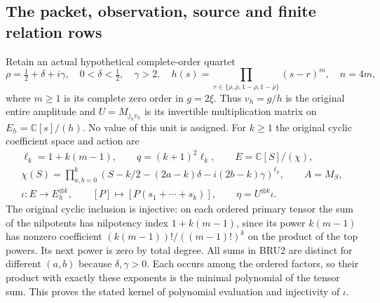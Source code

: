 \documentclass[11pt,a4paper]{article}
\begin{document}
\subsection{The packet, observation, source and finite relation rows}

Retain an actual hypothetical complete-order quartet
\[
 \rho=\tfrac12+\delta+i\gamma,\quad 0<\delta<\tfrac12,\quad\gamma>2,
 \quad h(s)=\prod_{r\in\{\rho,\bar\rho,1-\rho,1-\bar\rho\}}(s-r)^m,
 \quad n=4m,
 \tag{BRU1}
\]
where $m\geq1$ is its complete zero order in $g=2\xi$.
Thus $v_h=g/h$ is the original entire amplitude and
$U=M_{j_hv_h}$ is its invertible multiplication matrix on
$E_h=\mathbb{C}[s]/(h)$. No value of this unit is assigned.
For $k\geq1$ the original cyclic coefficient space and action are
\[
 \begin{gathered}
 \ell_k=1+k(m-1),\qquad q=(k+1)^2\ell_k,\qquad E=\mathbb{C}[S]/(\chi),\\
 \chi(S)=\prod_{a,b=0}^k
 (S-k/2-(2a-k)\delta-i(2b-k)\gamma)^{\ell_k},\qquad
 A=M_S,\\
 \iota:E\longrightarrow E_h^{\otimes k},\qquad
 [P]\longmapsto[P(s_1+\cdots+s_k)],\qquad
 \eta=U^{\otimes k}\iota .
 \end{gathered}\tag{BRU2}
\]
The original cyclic inclusion is injective: on each ordered primary
tensor the sum of the nilpotents has nilpotency index
$1+k(m-1)$, since its power $k(m-1)$ has nonzero coefficient
$(k(m-1))!/((m-1)!)^k$ on the product of the top powers. Its next
power is zero by total degree. All sums in BRU2 are distinct for
different $(a,b)$ because $\delta,\gamma>0$. Each occurs among the
ordered factors, so their product with exactly these exponents is
the minimal polynomial of the tensor sum. This proves the stated
kernel of polynomial evaluation and injectivity of $\iota$.
\end{document}
